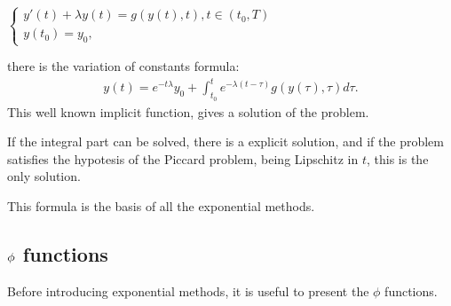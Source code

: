 \documentclass[letterpaper,10pt,english]{jupyterBook}
\begin{document}
\sphinxAtStartPar
\(\begin{cases}
    y'(t) + \lambda y(t) = g(y(t), t), t \in (t_0, T) \\
    y(t_0) = y_0 
    \text{,}
\end{cases}\)

\sphinxAtStartPar
there is the variation of constants formula:
\begin{equation*}
\begin{split}
    y(t) = e^{-t \lambda}y_0 + \int_{t_0}^t e^{-\lambda(t-\tau)} g(y(\tau), \tau) d\tau.
\end{split}
\end{equation*}
\sphinxAtStartPar
This well known implicit function, gives a solution of the problem.

\sphinxAtStartPar
If the integral part can be solved, there is a explicit solution, and if the problem satisfies the hypotesis of the Piccard problem, being Lipschitz in \(t\), this is the only solution.

\sphinxAtStartPar
This formula is the basis of all the exponential methods.


\subsection{\protect\(\phi\protect\) functions}
\label{\detokenize{cap3:phi-functions}}
\sphinxAtStartPar
Before introducing exponential methods, it is useful to present the \(\phi\) functions.
\end{document}
